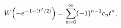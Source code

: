 \[\mathop{W\/}\nolimits\!\left(-e^{-1-(t^{2}/2)}\right)=\sum_{n=0}^{\infty}(-1)^%
{n-1}c_{n}t^{n},\]